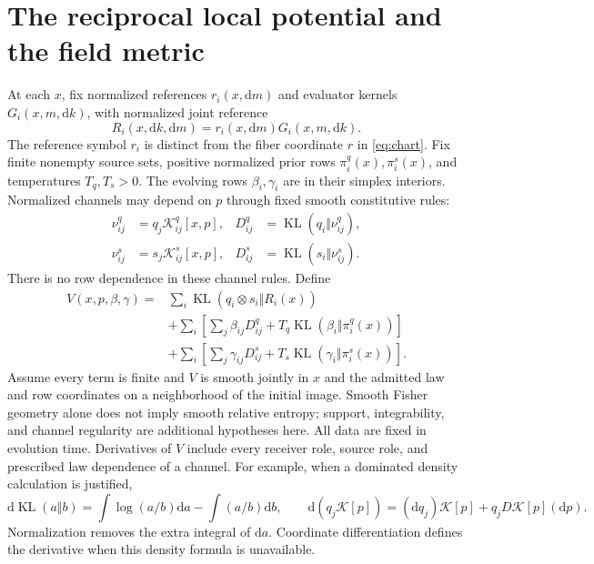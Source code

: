 \documentclass[11pt]{article}
\newcommand{\KL}{\operatorname{KL}}
\newcommand{\dd}{\mathrm d}
\begin{document}
\section{The reciprocal local potential and the field metric}

At each $x$, fix normalized references $r_i(x,\dd m)$ and evaluator kernels $G_i(x,m,\dd k)$, with normalized joint reference
\begin{equation}
 R_i(x,\dd k,\dd m)=r_i(x,\dd m)G_i(x,m,\dd k).
\end{equation}
The reference symbol $r_i$ is distinct from the fiber coordinate $r$ in \eqref{eq:chart}. Fix finite nonempty source sets, positive normalized prior rows $\pi_i^q(x),\pi_i^s(x)$, and temperatures $T_q,T_s>0$. The evolving rows $\beta_i,\gamma_i$ are in their simplex interiors. Normalized channels may depend on $p$ through fixed smooth constitutive rules:
\begin{align}
 \nu^q_{ij}&=q_j\mathcal K^q_{ij}[x,p],&
 D^q_{ij}&=\KL(q_i\Vert\nu^q_{ij}),\\
 \nu^s_{ij}&=s_j\mathcal K^s_{ij}[x,p],&
 D^s_{ij}&=\KL(s_i\Vert\nu^s_{ij}).
\end{align}
There is no row dependence in these channel rules. Define
\begin{align}
 V(x,p,\beta,\gamma)={}&\sum_i\KL(q_i\otimes s_i\Vert R_i(x))\nonumber\\
 &+\sum_i\left[\sum_j\beta_{ij}D^q_{ij}
                   +T_q\KL(\beta_i\Vert\pi_i^q(x))\right]\nonumber\\
 &+\sum_i\left[\sum_j\gamma_{ij}D^s_{ij}
                   +T_s\KL(\gamma_i\Vert\pi_i^s(x))\right].
 \label{eq:V}
\end{align}
Assume every term is finite and $V$ is smooth jointly in $x$ and the admitted law and row coordinates on a neighborhood of the initial image. Smooth Fisher geometry alone does not imply smooth relative entropy; support, integrability, and channel regularity are additional hypotheses here. All data are fixed in evolution time. Derivatives of $V$ include every receiver role, source role, and prescribed law dependence of a channel. For example, when a dominated density calculation is justified,
\begin{equation}
 \dd\KL(a\Vert b)=\int\log(a/b)\dd a-\int(a/b)\dd b,
 \qquad
 \dd(q_j\mathcal K[p])=(\dd q_j)\mathcal K[p]+q_jD\mathcal K[p](\dd p).
 \label{eq:roles}
\end{equation}
Normalization removes the extra integral of $\dd a$. Coordinate differentiation defines the derivative when this density formula is unavailable.
\end{document}
